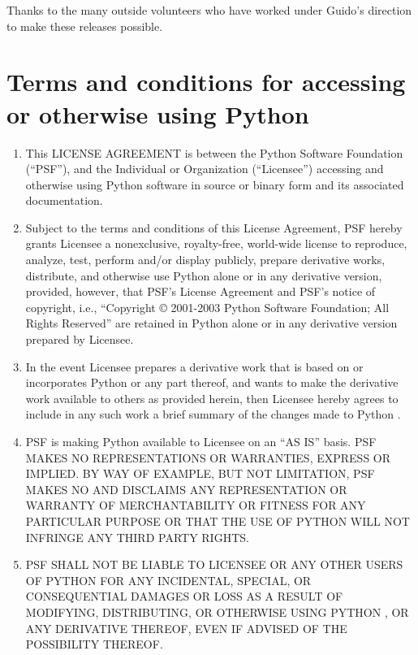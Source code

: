 Thanks to the many outside volunteers who have worked under Guido's
direction to make these releases possible.


\section{Terms and conditions for accessing or otherwise using Python}

\centerline{}

\begin{enumerate}
\item
This LICENSE AGREEMENT is between the Python Software Foundation
(``PSF''), and the Individual or Organization (``Licensee'') accessing
and otherwise using Python \version{} software in source or binary
form and its associated documentation.

\item
Subject to the terms and conditions of this License Agreement, PSF
hereby grants Licensee a nonexclusive, royalty-free, world-wide
license to reproduce, analyze, test, perform and/or display publicly,
prepare derivative works, distribute, and otherwise use Python
\version{} alone or in any derivative version, provided, however, that
PSF's License Agreement and PSF's notice of copyright, i.e.,
``Copyright \copyright{} 2001-2003 Python Software Foundation; All
Rights Reserved'' are retained in Python \version{} alone or in any
derivative version prepared by Licensee.

\item
In the event Licensee prepares a derivative work that is based on
or incorporates Python \version{} or any part thereof, and wants to
make the derivative work available to others as provided herein, then
Licensee hereby agrees to include in any such work a brief summary of
the changes made to Python \version.

\item
PSF is making Python \version{} available to Licensee on an ``AS IS''
basis.  PSF MAKES NO REPRESENTATIONS OR WARRANTIES, EXPRESS OR
IMPLIED.  BY WAY OF EXAMPLE, BUT NOT LIMITATION, PSF MAKES NO AND
DISCLAIMS ANY REPRESENTATION OR WARRANTY OF MERCHANTABILITY OR FITNESS
FOR ANY PARTICULAR PURPOSE OR THAT THE USE OF PYTHON \version{} WILL
NOT INFRINGE ANY THIRD PARTY RIGHTS.

\item
PSF SHALL NOT BE LIABLE TO LICENSEE OR ANY OTHER USERS OF PYTHON
\version{} FOR ANY INCIDENTAL, SPECIAL, OR CONSEQUENTIAL DAMAGES OR
LOSS AS A RESULT OF MODIFYING, DISTRIBUTING, OR OTHERWISE USING PYTHON
\version, OR ANY DERIVATIVE THEREOF, EVEN IF ADVISED OF THE
POSSIBILITY THEREOF.


\end{enumerate}
